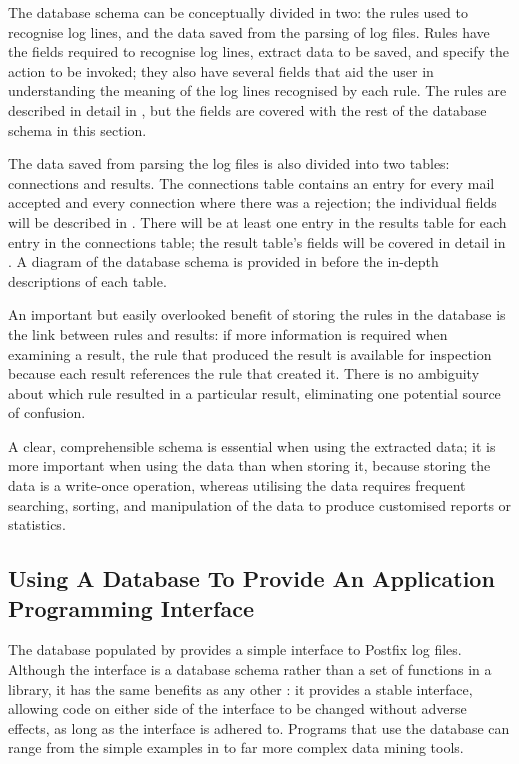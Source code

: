 The database schema can be conceptually divided in two: the rules used to
recognise log lines, and the data saved from the parsing of log files.
Rules have the fields required to recognise log lines, extract data to be
saved, and specify the action to be invoked; they also have several fields
that aid the user in understanding the meaning of the log lines recognised
by each rule.  The rules are described in detail in , but the fields are covered with the rest of the database
schema in this section.

The data saved from parsing the log files is also divided into two tables:
connections and results.  The connections table contains an entry for every
mail accepted and every connection where there was a rejection; the
individual fields will be described in .
There will be at least one entry in the results table for each entry in the
connections table; the result table's fields will be covered in detail in
.  A diagram of the database schema is provided
in  before the in-depth
descriptions of each table.

An important but easily overlooked benefit of storing the rules in the
database is the link between rules and results: if more information is
required when examining a result, the rule that produced the result is
available for inspection because each result references the rule that
created it.  There is no ambiguity about which rule resulted in a
particular result, eliminating one potential source of confusion.

A clear, comprehensible schema is essential when using the extracted data;
it is more important when using the data than when storing it, because
storing the data is a write-once operation, whereas utilising the data
requires frequent searching, sorting, and manipulation of the data to
produce customised reports or statistics.

\subsection{Using A Database To Provide An Application Programming Interface}

\label{database as API}

The database populated by \parsername{} provides a simple interface to
Postfix log files.  Although the interface is a database schema rather than
a set of functions in a library, it has the same benefits as any other
: it provides a stable interface, allowing code on either side
of the interface to be changed without adverse effects, as long as the
interface is adhered to.  Programs that use the database can range from the
simple examples in  to far more complex data mining
tools.

